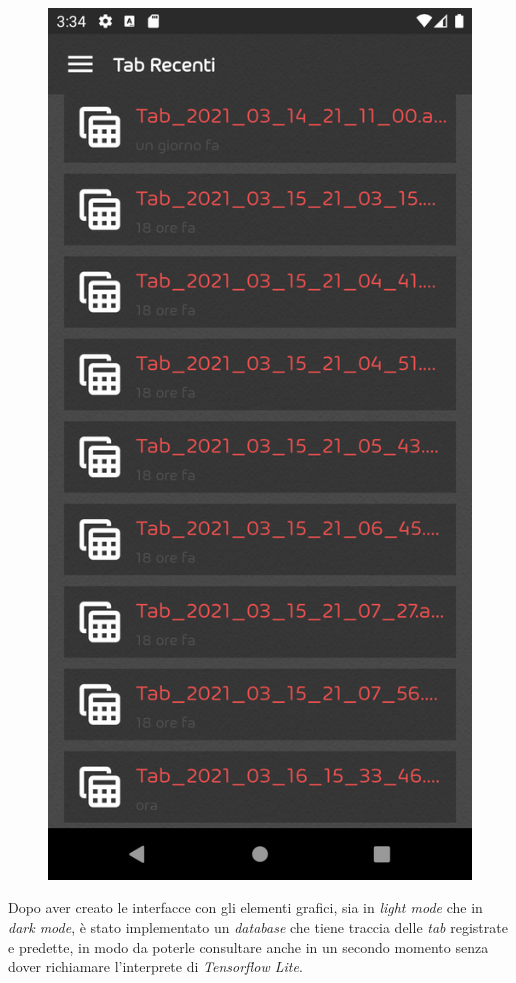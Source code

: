 \begin{figure}[H]
	\includegraphics[scale=0.10]{./images/img20.png}
\end{figure}
\noindent Dopo aver creato le interfacce con gli elementi grafici, sia in \textit{light mode} che in \textit{dark mode}, è stato implementato un \textit{database} che tiene traccia delle \textit{tab} registrate e predette, in modo da poterle consultare anche in un secondo momento senza dover richiamare l'interprete di \textit{Tensorflow Lite}.\\

